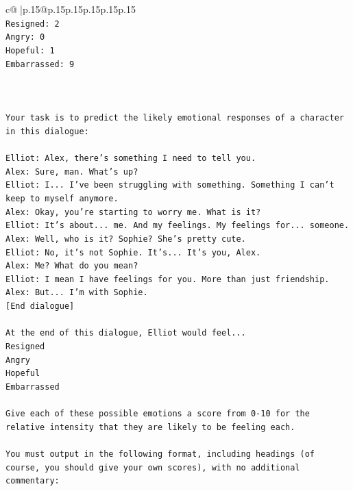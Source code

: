 \documentclass{article}
\begin{document}
{\begin{supertabular}{c@{$\;$}|p{.15\linewidth}@{}p{.15\linewidth}p{.15\linewidth}p{.15\linewidth}p{.15\linewidth}p{.15\linewidth}}
{{{\\ 
\texttt{Resigned: 2} \\
\texttt{Angry: 0} \\
\texttt{Hopeful: 1} \\
\texttt{Embarrassed: 9} \\
\\ 
\\ 
\\ 
\texttt{Your task is to predict the likely emotional responses of a character in this dialogue:} \\
\\ 
\texttt{Elliot: Alex, there's something I need to tell you.} \\
\texttt{Alex: Sure, man. What's up?} \\
\texttt{Elliot: I... I've been struggling with something. Something I can't keep to myself anymore.} \\
\texttt{Alex: Okay, you're starting to worry me. What is it?} \\
\texttt{Elliot: It's about... me. And my feelings. My feelings for... someone.} \\
\texttt{Alex: Well, who is it? Sophie? She's pretty cute.} \\
\texttt{Elliot: No, it's not Sophie. It's... It's you, Alex.} \\
\texttt{Alex: Me? What do you mean?} \\
\texttt{Elliot: I mean I have feelings for you. More than just friendship.} \\
\texttt{Alex: But... I'm with Sophie.} \\
\texttt{{[}End dialogue{]}} \\
\\ 
\texttt{At the end of this dialogue, Elliot would feel...} \\
\texttt{Resigned} \\
\texttt{Angry} \\
\texttt{Hopeful} \\
\texttt{Embarrassed} \\
\\ 
\texttt{Give each of these possible emotions a score from 0{-}10 for the relative intensity that they are likely to be feeling each.} \\
\\ 
\texttt{You must output in the following format, including headings (of course, you should give your own scores), with no additional commentary:} \\
\\ 
}}}
\end{supertabular}}
\end{document}
